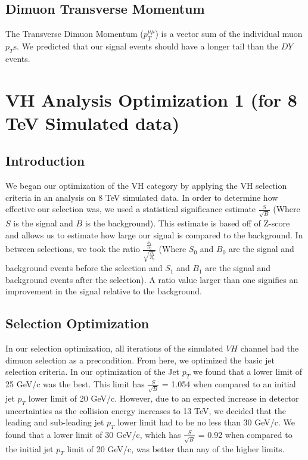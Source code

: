 \documentclass[12pt]{article}
\begin{document}
\subsection{Dimuon Transverse Momentum}

The Transverse Dimuon Momentum ($p_{T}^{\mu \mu}$) is a vector sum of the individual muon $p_{T}$s. 
We predicted that our signal events should have a longer tail than the $DY$ events.

\section{VH Analysis Optimization 1 (for 8 TeV Simulated data)}

\subsection{Introduction}

We began our optimization of the VH category by applying the VH selection criteria in an analysis on 8 TeV simulated data. 
In order to determine how effective our selection was, we used a statistical significance estimate $\frac{S}{\sqrt{B}}$ 
(Where $S$ is the signal and $B$ is the background). 
This estimate is based off of Z-score and allows us to estimate how large our signal is compared to the background. 
In between selections, we took the ratio $\frac{\frac{S_{1}}{S_{0}}}{\sqrt{\frac{B_{1}}{B_{0}}}}$ 
(Where $S_{0}$ and $B_{0}$ are the signal and background events before the selection 
and $S_{1}$ and $B_{1}$ are the signal and background events after the selection). 
A ratio value larger than one signifies an improvement in the signal relative to the background.

\subsection{Selection Optimization}

In our selection optimization, all iterations of the simulated $VH$ channel had the dimuon selection as a precondition. 
From here, we optimized the basic jet selection criteria. In our optimization of the Jet $p_{T}$ we found that a lower limit of 25 GeV/c was the best. 
This limit has $\frac{S}{\sqrt{B}}$ = 1.054 when compared to an initial jet $p_{T}$ lower limit of 20 GeV/c. 
However, due to an expected increase in detector uncertainties as the collision energy increases to 13 TeV, 
we decided that the leading and sub-leading jet $p_{T}$ lower limit had to be no less than 30 GeV/c. 
We found that a lower limit of 30 GeV/c, which has $\frac{S}{\sqrt{B}}$ = 0.92 when compared to the initial jet $p_{T}$ limit of 20 GeV/c, 
was better than any of the higher limits. 
\end{document}
